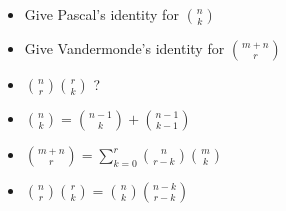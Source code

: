 \documentclass[12pt]{article}
\newcommand*{\xfield}[1]{\begin{mdframed}\centering #1\end{mdframed}\bigskip}
\newenvironment{note}{}{}
\begin{document}
\begin{note}
	\xfield{\begin{itemize}
	\item Give Pascal's identity for $\binom{n}{k}$
	\item Give Vandermonde's identity for $\binom{m+n}{r}$
	\item $\binom{n}{r}\binom{r}{k}$ ?
	\end{itemize} }
	\xfield{\begin{itemize}
	\item $\binom{n}{k} = \binom{n-1}{k} + \binom{n-1}{k-1}$
	\item  $\binom{m+n}{r} = \sum\limits^{r}_{k=0} \binom{n}{r-k}\binom{m}{k}$
	\item $\binom{n}{r}\binom{r}{k}=\binom{n}{k}\binom{n-k}{r-k}$
	\end{itemize} }
\end{note}

\begin{note}
	\xfield{}
	\xfield{ }
\end{note}
\end{document}
